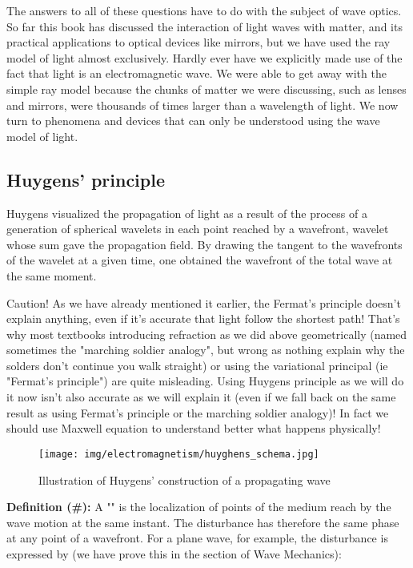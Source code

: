 	The answers to all of these questions have to do with the subject of wave optics. So far this book has discussed the interaction of light waves with matter, and its practical applications to optical devices like mirrors, but we have used the ray model of light almost exclusively. Hardly ever have we explicitly made use of the fact that light is an electromagnetic wave. We were able to get away with the simple ray model because the chunks of matter we were discussing, such as lenses and mirrors, were thousands of times larger than a wavelength of light. We now turn to phenomena and devices that can only be understood using the wave model of light.

	\subsection{Huygens' principle}\label{Huygens principle}
	Huygens visualized the propagation of light as a result of the process of a generation of spherical wavelets in each point reached by a wavefront, wavelet whose sum gave the propagation field. By drawing the tangent to the wavefronts of the wavelet at a given time, one obtained the wavefront of the total wave at the same moment.
	
	\begin{tcolorbox}[colback=red!5,borderline={1mm}{2mm}{red!5},arc=0mm,boxrule=0pt]
	\bcbombe Caution! As we have already mentioned it earlier, the Fermat's principle doesn't explain anything, even if it's accurate that light follow the shortest path! That's why most textbooks introducing refraction as we did above geometrically (named sometimes the "marching soldier analogy", but wrong as nothing explain why the solders don't continue you walk straight) or using the variational principal (ie "Fermat's principle") are quite misleading. Using Huygens principle as we will do it now isn't also accurate as we will explain it (even if we fall back on the same result as using Fermat's principle or the marching soldier analogy)! In fact we should use Maxwell equation to understand better what happens physically!
	\end{tcolorbox}
	
	\begin{figure}[H]
		\centering
		\texttt{[image: img/electromagnetism/huyghens\_schema.jpg]}
		\caption{Illustration of Huy­gens' construction of a prop­a­gat­ing wave}
	\end{figure}
	\textbf{Definition (\#\mydef):} A "" is the localization of points of the medium reach by the wave motion at the same instant. The disturbance has therefore the same phase at any point of a wavefront. For a plane wave, for example, the disturbance is expressed by (we have prove this in the section of Wave Mechanics):
	
